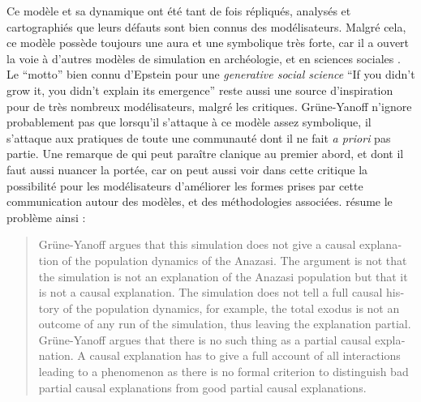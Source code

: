 Ce modèle et sa dynamique ont été tant de fois répliqués, analysés et cartographiés que leurs défauts sont bien connus des modélisateurs. Malgré cela, ce modèle possède toujours une aura et une symbolique très forte, car il a ouvert la voie à d'autres modèles de simulation en archéologie, et en sciences sociales \autocites{Janssen2009, Stonedahl2010, Schmitt2013}[151]{Schmitt2014}.
Le \enquote{motto} bien connu d'Epstein pour une \textit{generative social science} \foreignquote{english}{If you didn't grow it, you didn't explain its emergence} \autocites{Epstein1996} reste aussi une source d'inspiration pour de très nombreux modélisateurs, malgré les critiques. Grüne-Yanoff n'ignore probablement pas que lorsqu'il s'attaque à ce modèle assez symbolique, il s'attaque aux pratiques de toute une communauté dont il ne fait \textit{a priori} pas partie. Une remarque de \textcite{Chattoe2011} qui peut paraître clanique au premier abord, et dont il faut aussi nuancer la portée, car on peut aussi voir dans cette critique la possibilité pour les modélisateurs d'améliorer les formes prises par cette communication autour des modèles, et des méthodologies associées. \textcite{Elsenbroich2012} résume le problème ainsi :

\foreignblockquote{english}[\cite{Elsenbroich2012}]{Grüne-Yanoff argues that this simulation does not give a causal explanation of the population dynamics of the Anazasi. The argument is not that the simulation is not an explanation of the Anazasi population but that it is not a causal explanation. The simulation does not tell a full causal history of the population dynamics, for example, the total exodus is not an outcome of any run of the simulation, thus leaving the explanation partial. Grüne-Yanoff argues that there is no such thing as a partial causal explanation. A causal explanation has to give a full account of all interactions leading to a phenomenon as there is no formal criterion to distinguish bad partial causal explanations from good partial causal explanations.}

